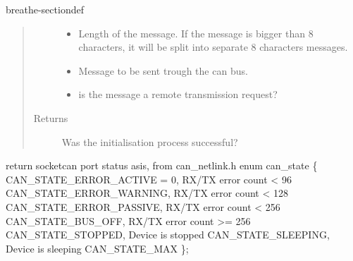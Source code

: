 \documentclass[a4paper,10pt,english]{sphinxmanual}
\begin{document}
\begin{fulllineitems}
\begin{sphinxuseclass}{breathe-sectiondef}
\begin{fulllineitems}
\begin{quote}
\begin{description}
\begin{itemize}
\item {} 
\sphinxAtStartPar
{} \textendash{} Length of the message. If the message is bigger than 8 characters, it will be split into separate 8 characters messages. 

\item {} 
\sphinxAtStartPar
{} \textendash{} Message to be sent trough the can bus. 

\item {} 
\sphinxAtStartPar
{} \textendash{} is the message a remote transmission request? 

\end{itemize}

\item[{Returns}] \leavevmode
\sphinxAtStartPar
Was the initialisation process successful?

\end{description}\end{quote}

\end{fulllineitems}


\begin{fulllineitems}
\label{\detokenize{classestracing:_CPPv4N12CSockCanScan13getPortStatusEv}}%
\pysigstartmultiline
{}%
\pysigstopmultiline
\sphinxAtStartPar
return socketcan port status as\sphinxhyphen{}is, from can\_netlink.h enum can\_state \{ CAN\_STATE\_ERROR\_ACTIVE = 0, RX/TX error count \textless{} 96 CAN\_STATE\_ERROR\_WARNING, RX/TX error count \textless{} 128 CAN\_STATE\_ERROR\_PASSIVE, RX/TX error count \textless{} 256 CAN\_STATE\_BUS\_OFF, RX/TX error count \textgreater{}= 256 CAN\_STATE\_STOPPED, Device is stopped CAN\_STATE\_SLEEPING, Device is sleeping CAN\_STATE\_MAX \}; 

\end{fulllineitems}


\end{sphinxuseclass}
\end{fulllineitems}
\end{document}
